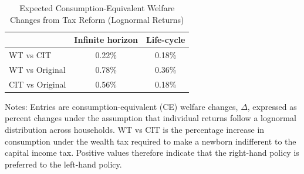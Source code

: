 \begin{table}[!htbp]
\centering
\caption{Expected Consumption-Equivalent Welfare Changes from Tax Reform (Lognormal Returns)}
\label{tab:ce_welfare_tax_lognorm}
\begin{threeparttable}
\begin{tabular}{lcc}
\toprule
& \textbf{Infinite horizon} & \textbf{Life-cycle} \\
\midrule
WT vs CIT       & 0.22\% & 0.18\% \\
WT vs Original  & 0.78\% & 0.36\% \\
CIT vs Original & 0.56\% & 0.18\% \\
\bottomrule
\end{tabular}
\begin{tablenotes}[flushleft]
\footnotesize
\item Notes: Entries are consumption-equivalent (CE) welfare changes, $\Delta$, expressed as percent changes under the assumption that individual returns follow a lognormal distribution across households. WT vs CIT is the percentage increase in consumption under the wealth tax required to make a newborn indifferent to the capital income tax. Positive values therefore indicate that the right-hand policy is preferred to the left-hand policy.
\end{tablenotes}
\end{threeparttable}
\end{table}
